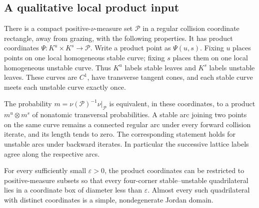 \subsection{A qualitative local product input}
\begin{lemma}
\label{lem:regular-collision-product}
There is a compact positive-$\nu$-measure set $\mathcal P$ in a regular
collision coordinate rectangle, away from grazing, with the following
properties. It has product coordinates
$\Psi:K^u\times K^s\longrightarrow\mathcal P$. Write a product point as $\Psi(u,s)$. Fixing $u$ places points on one
local homogeneous stable curve; fixing $s$ places them on one local
homogeneous unstable curve. Thus $K^u$ labels stable leaves and $K^s$
labels unstable leaves. These curves are $C^1$, have transverse tangent cones,
and each stable curve meets each unstable curve exactly once.

The probability $m=\nu(\mathcal P)^{-1}\nu|_{\mathcal P}$ is equivalent,
in these coordinates, to a product $m^u\otimes m^s$ of nonatomic
transversal probabilities. A stable arc joining two points on the same
curve remains a connected regular arc under every forward collision
iterate, and its length tends to zero. The corresponding statement
holds for unstable arcs under backward iterates. In particular the
successive lattice labels agree along the respective arcs.

For every sufficiently small $\varepsilon>0$, the product coordinates
can be restricted to positive-measure subsets so that every four-corner
stable--unstable quadrilateral lies in a coordinate box of diameter
less than $\varepsilon$. Almost every such quadrilateral with distinct
coordinates is a simple, nondegenerate Jordan domain.
\end{lemma}
